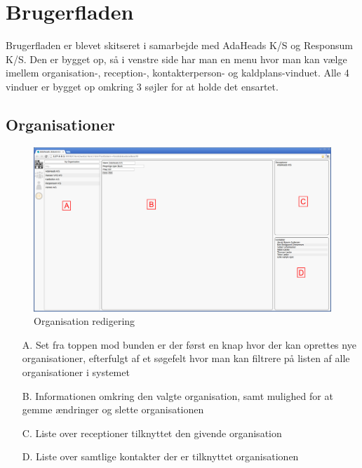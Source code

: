 \pagebreak
\section{Brugerfladen}
Brugerfladen er blevet skitseret i samarbejde med AdaHeads K/S og Responsum K/S.
Den er bygget op, så i venstre side har man en menu hvor man kan vælge imellem organisation-, reception-, kontakterperson- og kaldplans-vinduet. Alle 4 vinduer er bygget op omkring 3 søjler for at holde det ensartet.

\subsection{Organisationer}
\begin{figure}[ht!]
\centering
\includegraphics[width=\textwidth]{images/screen_org.png}
\caption{Organisation redigering}
\label{fig:screenorg}
\end{figure}
\begin{enumerate}
	\item[A.] {Set fra toppen mod bunden er der først en knap hvor der kan oprettes nye organisationer, efterfulgt af et søgefelt hvor man kan filtrere på listen af alle organisationer i systemet}
	\item[B.] {Informationen omkring den valgte organisation, samt mulighed for at gemme ændringer og slette organisationen}
	\item[C.] {Liste over receptioner tilknyttet den givende organisation}
	\item[D.] {Liste over samtlige kontakter der er tilknyttet organisationen}
\end{enumerate}



